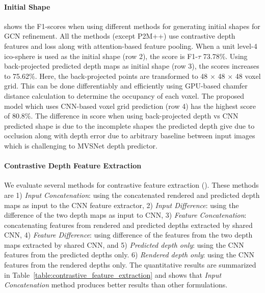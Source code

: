 \paragraph{Initial Shape}\vspace{-4mm}
 shows the F1-scores when using different methods for generating initial shapes for GCN refinement.
All the methods (except P2M++) use contrastive depth features and loss along with attention-based feature pooling.
When a unit level-4 ico-sphere is used as the initial shape (row 2), the score is F1-$\tau$ 73.78\%.
Using back-projected predicted depth maps as initial shape (row 3), the scores increases to 75.62\%.
Here, the back-projected points are transformed to 48 $\times$ 48 $\times$ 48 voxel grid.
This can be done differentiably and efficiently using GPU-based chamfer distance calculation to determine the occupancy of each voxel.
The proposed model which uses CNN-based voxel grid prediction (row 4) has the highest score of 80.8\%.
The difference in score when using back-projected depth vs CNN predicted shape is due to the incomplete shapes the predicted depth give due to occlusion along with depth error due to arbitrary baseline between input images which is challenging to MVSNet depth predictor.

\paragraph{Contrastive Depth Feature Extraction}\vspace{-4mm}
We evaluate several methods for contrastive feature extraction (). These methods are
1) \emph{Input Concatenation}: using the concatenated rendered and predicted depth maps as input to the CNN feature extractor,
2) \emph{Input Difference}: using the difference of the two depth maps as input to CNN,
3) \emph{Feature Concatenation}: concatenating features from rendered and predicted depths extracted by shared CNN,
4) \emph{Feature Difference}: using difference of the features from the two depth maps extracted by shared CNN, and
5) \emph{Predicted depth only}: using the CNN features from the predicted depths only.
6) \emph{Rendered depth only}: using the CNN features from the rendered depths only.
The quantitative results are summarized in Table~\ref{table:contrastive_feature_extraction} and shows that \emph{Input Concatenation} method produces better results than other formulations.

